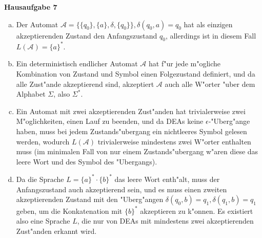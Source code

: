 \documentclass[a4paper,12pt]{article}
\newcommand{\Aufgabe}[1]{
        {
        \vspace*{0.5cm}
        \textbf{Hausaufgabe #1}
        \vspace*{0.2cm}
    }
}
\begin{document}
    \Aufgabe{7}
    \begin{enumerate}[(a)]
        \item
        Der Automat $ \mathcal{A}  = \{\{q_0\}, \{a\}, \delta, \{q_0\}\}, \delta(q_0, a) = q_0 $ hat als einzigen
        akzeptierenden Zustand den Anfangszustand $ q_0 $, allerdings ist in diesem Fall $ L(\mathcal{A}) = \{a\}^* $.

        \item
        Ein deterministisch endlicher Automat $ \mathcal{A} $ hat f"ur jede m"ogliche Kombination von
        Zustand und Symbol einen Folgezustand definiert, und da alle Zust"ande akzeptierend sind, akzeptiert $ \mathcal{A} $
        auch alle W"orter "uber dem Alphabet $ \Sigma $, also $ \Sigma^* $.

        \item
        Ein Automat mit zwei akzeptierenden Zust"anden hat trivialerweise zwei M"oglichkeiten, einen Lauf zu beenden,
        und da DEAs keine $ \epsilon $-"Uberg"ange haben, muss bei jedem Zustands"ubergang ein nichtleeres Symbol gelesen werden, wodurch
        $ L(\mathcal{A}) $ trivialerweise mindestens zwei W"orter enthalten muss (im minimalen Fall von nur einem
        Zustands"ubergang w"aren diese das leere Wort und des Symbol des "Ubergangs).

        \item
        Da die Sprache $ L = \{a\}^* \cdot \{b\}^* $ das leere Wort enth"alt, muss der Anfangszustand auch akzeptierend
        sein, und es muss einen zweiten akzeptierenden Zustand mit den "Uberg"angen $ \delta(q_0, b) = q_1 , \delta(q_1, b) = q_1 $
        geben, um die Konkatenation mit $ \{b\}^* $ akzeptieren zu k"onnen.
        Es existiert also eine Sprache $ L $, die nur von DEAs mit mindestens zwei akzeptierenden Zust"anden erkannt wird.
    \end{enumerate}
\end{document}
